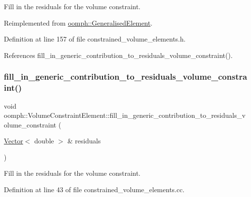 Fill in the residuals for the volume constraint. 



Reimplemented from \hyperlink{classoomph_1_1GeneralisedElement_a310c97f515e8504a48179c0e72c550d7}{oomph\+::\+Generalised\+Element}.



Definition at line 157 of file constrained\+\_\+volume\+\_\+elements.\+h.



References fill\+\_\+in\+\_\+generic\+\_\+contribution\+\_\+to\+\_\+residuals\+\_\+volume\+\_\+constraint().

\mbox{\label{classoomph_1_1VolumeConstraintElement_a1139fafaca2b784c0561457606cc307e}} 
\subsubsection{\texorpdfstring{fill\+\_\+in\+\_\+generic\+\_\+contribution\+\_\+to\+\_\+residuals\+\_\+volume\+\_\+constraint()}{fill\_in\_generic\_contribution\_to\_residuals\_volume\_constraint()}}
{\footnotesize\ttfamily void oomph\+::\+Volume\+Constraint\+Element\+::fill\+\_\+in\+\_\+generic\+\_\+contribution\+\_\+to\+\_\+residuals\+\_\+volume\+\_\+constraint (\begin{DoxyParamCaption}\item[{\hyperlink{classoomph_1_1Vector}{Vector}$<$ double $>$ \&}]{residuals }\end{DoxyParamCaption})\hspace{0.3cm}{\ttfamily [private]}}



Fill in the residuals for the volume constraint. 



Definition at line 43 of file constrained\+\_\+volume\+\_\+elements.\+cc.



